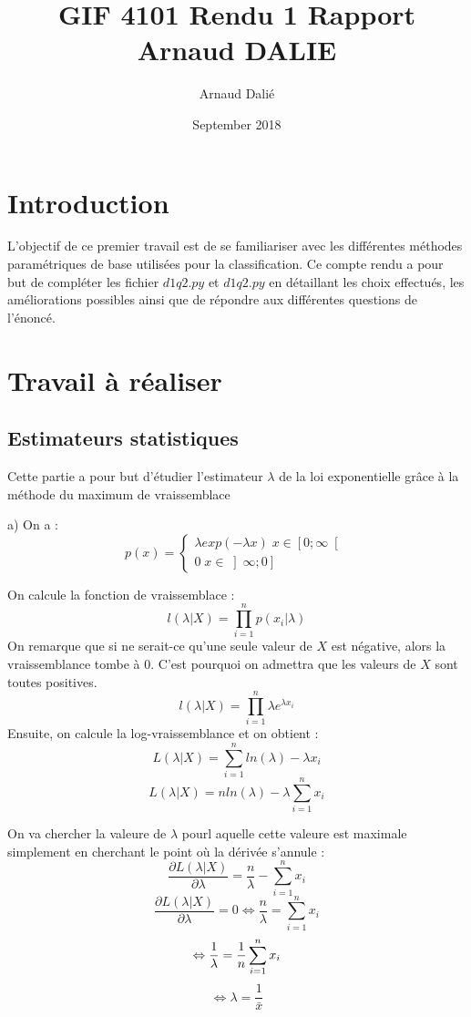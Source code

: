 \documentclass{article}
\title{GIF 4101 Rendu 1 Rapport Arnaud DALIE}
\author{Arnaud Dalié }
\date{September 2018}
\begin{document}
\maketitle

\section{Introduction}
L'objectif de ce premier travail est de se familiariser avec les différentes méthodes paramétriques de base utilisées pour la classification.
Ce compte rendu a pour but de compléter les fichier $d1q2.py$ et $d1q2.py$ en détaillant les choix effectués, les améliorations possibles ainsi que de répondre aux différentes questions de l'énoncé.

\section{Travail à réaliser}

\subsection{Estimateurs statistiques}

Cette partie a pour but d'étudier l'estimateur $\lambda$ de la loi exponentielle grâce à la méthode du maximum de vraissemblace

a) On a :
$$
p(x) = \left\{
    \begin{array}{ll}
        \lambda exp(-\lambda x) \; x \in \left [ 0; \infty  \right [ \\
        0 \; x \in \left ] \infty ; 0  \right ]
    \end{array}
\right.
$$

On calcule la fonction de vraissemblace : 
$$
l(\lambda | X) = \prod_{i = 1}^{n} p(x_{i} | \lambda)
$$
On remarque que si ne serait-ce qu'une seule valeur de $X$ est négative, alors la vraissemblance tombe à $0$. C'est pourquoi on admettra que les valeurs de $X$ sont toutes positives.
$$
l(\lambda | X) = \prod_{i = 1}^{n} \lambda e^{\lambda x_{i}}
$$
Ensuite, on calcule la log-vraissemblance et on obtient :
$$
L(\lambda | X) = \sum_{i = 1}^{n} ln(\lambda) - \lambda x_{i}
$$
$$
L(\lambda | X) = nln(\lambda) - \lambda \sum_{i = 1}^{n} x_{i}
$$

On va chercher la valeure de $\lambda$ pourl aquelle cette valeure est maximale simplement en cherchant le point où la dérivée s'annule : 
$$
\frac{\partial L(\lambda | X)}{\partial \lambda} = \frac{n}{\lambda} - \sum_{i = 1}^{n} x_{i} 
$$
$$
\frac{\partial L(\lambda | X)}{\partial \lambda} = 0 \Leftrightarrow \frac{n}{\lambda} =\sum_{i = 1}^{n} x_{i} 
$$
$$
\Leftrightarrow \frac{1}{\lambda} = \frac{1}{n} \sum_{i = 1}^{n} x_{i} \\
$$
$$
\Leftrightarrow \lambda = \frac{1}{\bar{x}}
$$
\end{document}
